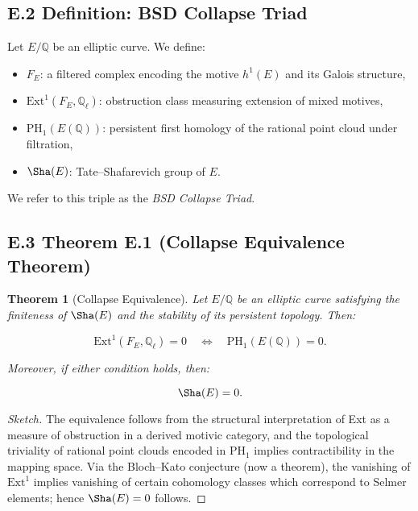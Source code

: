 \documentclass[11pt]{article}
\newtheorem{theorem}{Theorem}[section]
\theoremstyle{definition}
\begin{document}
\subsection*{E.2 Definition: BSD Collapse Triad}

Let \( E/\mathbb{Q} \) be an elliptic curve. We define:

\begin{itemize}
  \item \( F_E \): a filtered complex encoding the motive \( h^1(E) \) and its Galois structure,
  \item \( \mathrm{Ext}^1(F_E, \mathbb{Q}_\ell) \): obstruction class measuring extension of mixed motives,
  \item \( \mathrm{PH}_1(E(\mathbb{Q})) \): persistent first homology of the rational point cloud under filtration,
  \item \( \Sha(E) \): Tate--Shafarevich group of \( E \).
\end{itemize}

We refer to this triple as the \emph{BSD Collapse Triad}.

\subsection*{E.3 Theorem E.1 (Collapse Equivalence Theorem)}

\begin{theorem}[Collapse Equivalence]
Let \( E/\mathbb{Q} \) be an elliptic curve satisfying the finiteness of \( \Sha(E) \) and the stability of its persistent topology. Then:

\[
\mathrm{Ext}^1(F_E, \mathbb{Q}_\ell) = 0 \quad \Longleftrightarrow \quad \mathrm{PH}_1(E(\mathbb{Q})) = 0.
\]

Moreover, if either condition holds, then:

\[
\Sha(E) = 0.
\]
\end{theorem}

\begin{proof}[Sketch]
The equivalence follows from the structural interpretation of Ext as a measure of obstruction in a derived motivic category,  
and the topological triviality of rational point clouds encoded in \( \mathrm{PH}_1 \) implies contractibility in the mapping space.  
Via the Bloch--Kato conjecture (now a theorem), the vanishing of \( \mathrm{Ext}^1 \) implies vanishing of certain cohomology classes  
which correspond to Selmer elements; hence \( \Sha(E) = 0 \) follows.
\end{proof}
\end{document}
